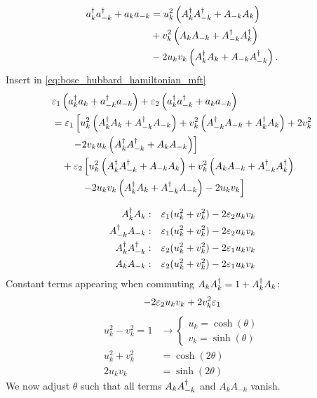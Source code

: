 \begin{equation}
	\begin{aligned}
			a_{k}^{\dagger}a_{-k}^{\dagger} + a_{k}a_{-k} &= u_{k}^2\left (A_{k}^{\dagger}A_{-k}^{\dagger} + A_{-k}A_{k}\right ) \\
			&+ v_k^2\left (A_{k}A_{-k} + A_{-k}^{\dagger}A_{k}^{\dagger}\right ) \\
			& -2u_kv_k\left (A_{k}^{\dagger}A_{k} + A_{-k}A_{-k}^{\dagger}\right ).
	\end{aligned}
\end{equation}
Insert in \cref{eq:bose_hubbard_hamiltonian_mft}
\begin{equation}
	\begin{aligned}
	&\varepsilon_1\left (a_{k}^{\dagger}a_{k} + a_{-k}^{\dagger}a_{-k}\right ) + \varepsilon_{2}\left (a_{k}^{\dagger}a_{-k}^{\dagger} + a_{k}a_{-k}\right ) \\
	&= \varepsilon_{1}\left [u_k^2\left (A_{k}^{\dagger}A_{k} +A_{-k}^{\dagger}A_{-k}\right ) + v_{k}^2\left (A_{-k}^{\dagger}A_{-k} + A_{k}^{\dagger}A_{k}\right ) + 2v_k^2\right . \\
	&\qquad \left .-2v_ku_k\left (A_{k}^{\dagger}A_{-k}^{\dagger}+A_{k}A_{-k}\right )\right ] \\
	&\quad+ \varepsilon_2 \left [u_{k}^2\left (A_{k}^{\dagger}A_{-k}^{\dagger} + A_{-k}A_{k}\right )+ v_k^2\left (A_{k}A_{-k} + A_{-k}^{\dagger}A_{k}^{\dagger}\right )\right . \\
	&\quad \qquad \left . -2u_kv_k\left (A_{k}^{\dagger}A_{k} + A_{-k}^{\dagger}A_{-k}\right ) - 2u_kv_k\right ]
	\end{aligned}
\end{equation}

\begin{equation}
	\begin{aligned}
		A_{k}^{\dagger}A_{k}: && \varepsilon_1(u_k^2 + v_k^2)-2\varepsilon_2 u_kv_k \\	A_{-k}^{\dagger}A_{-k}: && \varepsilon_1(u_k^2 + v_k^2)-2\varepsilon_2 u_kv_k \\
		A_{k}^{\dagger}A_{-k}^{\dagger}: && \varepsilon_2(u_k^2 + v_k^2)-2\varepsilon_1 u_kv_k\\
		A_{k}A_{-k}: && \varepsilon_2(u_k^2 + v_k^2)-2\varepsilon_1 u_kv_k
	\end{aligned}
\end{equation}
Constant terms appearing when commuting $A_{k}A_{k}^{\dagger} = 1 + A_{k}^{\dagger}A_{k}$:
\begin{equation}
	-2\varepsilon_2u_kv_k + 2v_k^2\varepsilon_1
\end{equation}
\begin{align*}
	u_k^2-v_k^2 = 1 &\rightarrow \begin{cases*}
		u_k = \cosh(\theta) \\
		v_k = \sinh(\theta)
	\end{cases*} \\
	u_k^2 + v_k^2 &= \cosh(2\theta) \\
	2u_kv_k &= \sinh(2\theta)
\end{align*}
We now adjust $\theta$ such that all terms $A_{k}A_{-k}^{\dagger}$ and  $A_{k}A_{-k}$ vanish.

